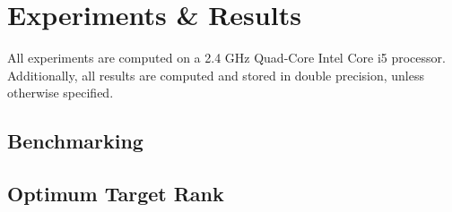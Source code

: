 \chapter{Experiments \& Results}\label{chpt:3}
All experiments are computed on a 2.4 GHz Quad-Core Intel Core i5 processor.
Additionally, all results are computed and stored in double precision, unless
otherwise specified.

\section{Benchmarking}\label{sec:3_1_benchmarking}


\section{Optimum Target Rank}\label{sec:3_2_svd_params}
